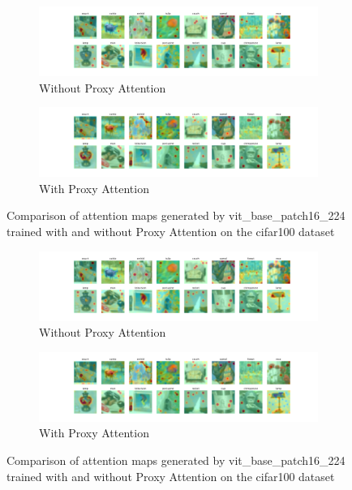     \begin{figure}[H]
        \centering
        \begin{subfigure}[b]{1\textwidth}
            \includegraphics[width=\textwidth]{images/cifar100_vit_base_patch16_224_noproxy_0.pdf}
            \caption{Without Proxy Attention}
        \end{subfigure}
        \hfill
        \begin{subfigure}[b]{1\textwidth}
            \includegraphics[width=\textwidth]{images/cifar100_vit_base_patch16_224_proxy_0.pdf}
            \caption{With Proxy Attention}
        \end{subfigure}
        \caption{Comparison of attention maps generated by vit\_base\_patch16\_224 trained with and without Proxy Attention on the cifar100 dataset}
    \end{figure}
    

    \begin{figure}[H]
        \centering
        \begin{subfigure}[b]{1\textwidth}
            \includegraphics[width=\textwidth]{images/cifar100_vit_base_patch16_224_noproxy_0.pdf}
            \caption{Without Proxy Attention}
        \end{subfigure}
        \hfill
        \begin{subfigure}[b]{1\textwidth}
            \includegraphics[width=\textwidth]{images/cifar100_vit_base_patch16_224_proxy_0.pdf}
            \caption{With Proxy Attention}
        \end{subfigure}
        \caption{Comparison of attention maps generated by vit\_base\_patch16\_224 trained with and without Proxy Attention on the cifar100 dataset}
    \end{figure}
    
